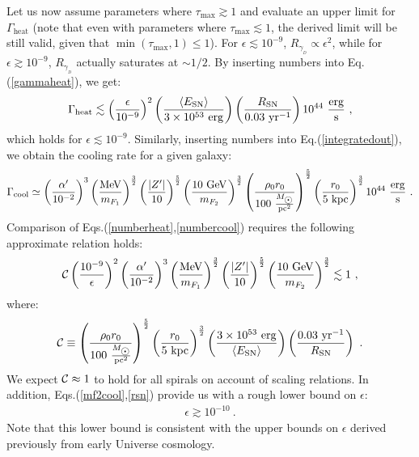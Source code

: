 \documentclass[12pt]{article}
\begin{document}
{{Let us now assume parameters where $\tau _{\max} \gtrsim 1$ and evaluate an upper limit for $\Gamma _{\text{heat}}$ (note that even with parameters where $\tau _{\max} \lesssim 1$, the derived limit will be still valid, given that $\min (\tau _{\max},1) \leq 1$). For $\epsilon \lesssim 10 ^{-9}$, $R _{\gamma _{_D}} \propto \epsilon ^2$, while for $\epsilon \gtrsim 10 ^{-9}$, $R _{\gamma _{_D}}$ actually saturates at $\sim 1/2$. By inserting numbers into Eq.(\ref{gammaheat}), we get:
%
\begin{eqnarray}
\Gamma _{\text{heat}} \lesssim \left (\frac{\epsilon}{10 ^{-9}} \right ) ^2\left (\frac{\langle E _{\text{SN}} \rangle}{3 \times 10 ^{53} \ \rm erg} \right )\left (\frac{R _{\text{SN}}}{0.03 \ \rm yr ^{-1}} \right ) 10 ^{44} \ \rm \frac{erg}{s} \ ,
\label{numberheat}
\end{eqnarray}
%
which holds for $\epsilon \lesssim 10 ^{-9}$. Similarly, inserting numbers into Eq.(\ref{integratedout}), we obtain the cooling rate for a given galaxy:
%
\begin{eqnarray}
\Gamma _{\text{cool}} \simeq \left (\frac{\alpha '}{10 ^{-2}} \right ) ^3\left (\frac{\rm MeV}{m _{F_1}} \right ) ^{\frac{3}{2}}\left ( \frac{|Z'|}{10} \right ) ^{\frac{5}{2}}\left (\frac{10 \ \rm GeV}{m _{F_2}} \right ) ^{\frac{3}{2}}\left (\frac{\rho _0r _0}{100 \ \frac{M _{\astrosun}}{\rm pc ^2}} \right ) ^{\frac{5}{2}}\left (\frac{r _0}{5 \ \rm kpc} \right ) ^{\frac{3}{2}} 10 ^{44} \ \rm \frac{erg}{s} \ .
\label{numbercool}
\end{eqnarray}
%
Comparison of Eqs.(\ref{numberheat},\ref{numbercool}) requires the following approximate relation holds:
%
\begin{eqnarray}
{\cal C}\left (\frac{10 ^{-9}}{\epsilon} \right ) ^2\left (\frac{\alpha '}{10 ^{-2}} \right ) ^3\left (\frac{\rm MeV}{m _{F_1}} \right ) ^{\frac{3}{2}}\left (\frac{|Z'|}{10} \right ) ^{\frac{5}{2}}\left (\frac{10 \ \rm GeV}{m _{F_2}} \right ) ^{\frac{3}{2}} \lesssim 1 \ ,
\label{rsn}
\end{eqnarray}
%
where:
%
\begin{eqnarray}
{\cal C} \equiv \left (\frac{\rho _0r _0}{100 \ \frac{M _{\astrosun}}{\rm pc ^2}} \right ) ^{\frac{5}{2}}\left (\frac{r _0}{5 \ \rm kpc} \right ) ^{\frac{3}{2}}\left (\frac{3 \times 10 ^{53} \ \rm erg}{\langle E _{\text{SN}} \rangle} \right )\left ( \frac{0.03 \ \rm yr ^{-1}}{R _{\text{SN}}} \right ) \ .
\label{calc}
\end{eqnarray}
%
We expect ${\cal C} \approx 1$ to hold for all spirals on account of scaling relations. In addition, Eqs.(\ref{mf2cool},\ref{rsn}) provide us with a
rough lower bound on $\epsilon$:
%
\begin{eqnarray}
\epsilon \gtrsim 10 ^{-10} \ .
\label{boundepsilon}
\end{eqnarray}
%
Note that this lower bound is consistent with the upper bounds on $\epsilon$ derived previously from early Universe cosmology.

}}
\end{document}
